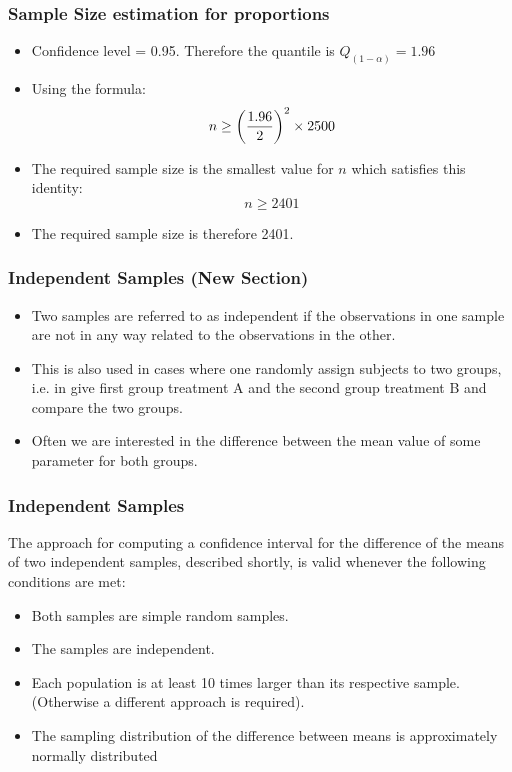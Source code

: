 \documentclass[a4]{beamer}
\begin{document}
\begin{frame}
\frametitle{Sample Size estimation for proportions}

\begin{itemize}
\item Confidence level = 0.95. Therefore the quantile is $Q_{(1-\alpha)} = 1.96$
\item Using the formula: \[ n \geq \left({1.96 \over 2 }\right)^2 \times 2500  \]
\item The required sample size is the smallest value for $n$ which satisfies this identity: \[ n \geq 2401  \]
\item The required sample size is therefore 2401.
\end{itemize}
\end{frame}


\begin{frame}
\frametitle{Independent Samples (New Section)}
\begin{itemize}
\item Two samples are referred to as independent if the observations in one sample are not in any way related to the observations in the other. \item This is also used in cases where one randomly assign subjects to two groups, i.e. in give first group treatment A and the second group treatment B and compare the two groups.
\item Often we are interested in the difference between the mean value of some parameter for both groups.
\end{itemize}
\end{frame}

\begin{frame}
\frametitle{Independent Samples}

The approach for computing a confidence interval for the difference of the means of two independent samples,  described shortly, is valid whenever the following conditions are met:

\begin{itemize}
\item Both samples are simple random samples.
\item The samples are independent.
\item Each population is at least 10 times larger than its respective sample. (Otherwise a different approach is required).
\item The sampling distribution of the difference between means is approximately normally distributed
\end{itemize}

\end{frame}
\end{document}
